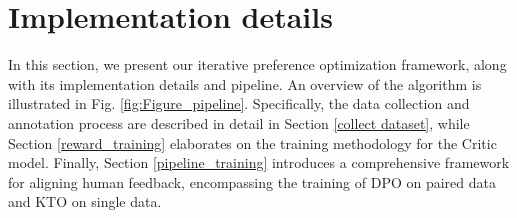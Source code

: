 \section{Implementation details}
\label{sec:detail} 
% 


In this section, we present our iterative preference optimization framework, along with its implementation details and pipeline. An overview of the algorithm is illustrated in Fig. \ref{fig:Figure_pipeline}. Specifically, the data collection and annotation process are described in detail in Section \ref{collect dataset}, while Section \ref{reward_training} elaborates on the training methodology for the Critic model. Finally, Section \ref{pipeline_training} introduces a comprehensive framework for aligning human feedback, encompassing the training of DPO on paired data and KTO on single data.





